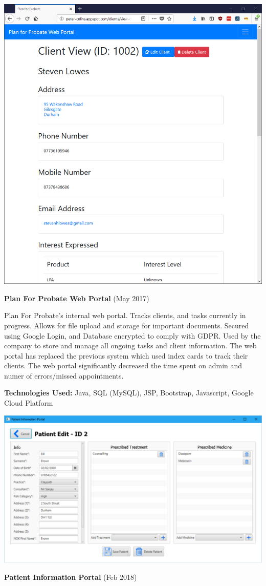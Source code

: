 \documentclass[hidelinks, 12pt, a4paper]{article}
\begin{document}
	\hspace{0.02\textwidth}
	\begin{minipage}{0.40\textwidth}		
		\begin{center}
			\includegraphics[width=0.9\linewidth]{planforprobate.png}
		\end{center}
		\vspace{-12pt}
		\textbf{Plan For Probate Web Portal} (May 2017)
		
		Plan For Probate's internal web portal. Tracks clients, and tasks currently in progress. Allows for file upload and storage for important documents. Secured using Google Login, and Database encrypted to comply with GDPR. Used by the company to store and manage all ongoing tasks and client information. The web portal has replaced the previous system which used index cards to track their clients. The web portal significantly decreased the time spent on admin and numer of errors/missed appointments.
		
		\textbf{Technologies Used:} Java, SQL (MySQL), JSP, Bootstrap, Javascript, Google Cloud Platform
		
		\begin{center}
			\includegraphics[width=0.9\linewidth]{sarahassignment.png}
		\end{center}
		\vspace{-12pt}
		\textbf{Patient Information Portal} (Feb 2018)
		

\end{minipage}
\end{document}
